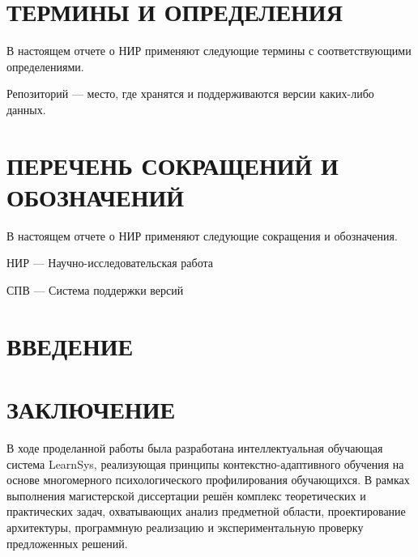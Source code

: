 \documentclass[a4paper,12pt]{article}
\begin{document}
\pagebreak


\section*{\centering ТЕРМИНЫ И ОПРЕДЕЛЕНИЯ}
В настоящем отчете о НИР применяют следующие термины с соответствующими определениями.

Репозиторий --- место, где хранятся и поддерживаются версии каких-либо данных. 

\pagebreak

\section*{\centering ПЕРЕЧЕНЬ СОКРАЩЕНИЙ И ОБОЗНАЧЕНИЙ}

В настоящем отчете о НИР применяют следующие сокращения и обозначения.

НИР --- Научно-исследовательская работа

СПВ --- Система поддержки версий

\pagebreak

\section*{\centering ВВЕДЕНИЕ}
\pagebreak

%
\pagebreak
\pagebreak
\pagebreak




\section*{\centering ЗАКЛЮЧЕНИЕ}

В ходе проделанной работы была разработана интеллектуальная обучающая система LearnSys, реализующая принципы контекстно-адаптивного обучения на основе многомерного психологического профилирования обучающихся. В рамках выполнения магистерской диссертации решён комплекс теоретических и практических задач, охватывающих анализ предметной области, проектирование архитектуры, программную реализацию и экспериментальную проверку предложенных решений.
\end{document}

